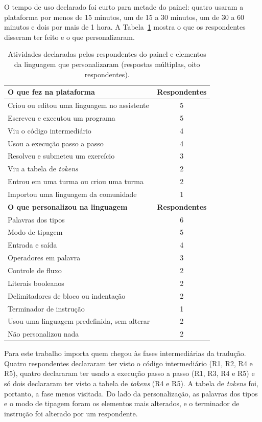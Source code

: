 O tempo de uso declarado foi curto para metade do painel: quatro usaram a plataforma por menos de 15 minutos, um de 15 a 30 minutos, um de 30 a 60 minutos e dois por mais de 1 hora. A Tabela~\ref{tab:resultado-atividades} mostra o que os respondentes disseram ter feito e o que personalizaram.

\begin{table}[htbp]
\centering
\caption{Atividades declaradas pelos respondentes do painel e elementos da linguagem que personalizaram (respostas múltiplas, oito respondentes).}
\label{tab:resultado-atividades}
\footnotesize
\renewcommand{\arraystretch}{1.2}
\begin{tabular}{|p{10.5cm}|c|}
\hline
\textbf{O que fez na plataforma} & \textbf{Respondentes} \\\hline
Criou ou editou uma linguagem no assistente & 5 \\\hline
Escreveu e executou um programa & 5 \\\hline
Viu o código intermediário & 4 \\\hline
Usou a execução passo a passo & 4 \\\hline
Resolveu e submeteu um exercício & 3 \\\hline
Viu a tabela de \textit{tokens} & 2 \\\hline
Entrou em uma turma ou criou uma turma & 2 \\\hline
Importou uma linguagem da comunidade & 1 \\\hline
\textbf{O que personalizou na linguagem} & \textbf{Respondentes} \\\hline
Palavras dos tipos & 6 \\\hline
Modo de tipagem & 5 \\\hline
Entrada e saída & 4 \\\hline
Operadores em palavra & 3 \\\hline
Controle de fluxo & 2 \\\hline
Literais booleanos & 2 \\\hline
Delimitadores de bloco ou indentação & 2 \\\hline
Terminador de instrução & 1 \\\hline
Usou uma linguagem predefinida, sem alterar & 2 \\\hline
Não personalizou nada & 2 \\\hline
\end{tabular}
\end{table}

Para este trabalho importa quem chegou às fases intermediárias da tradução. Quatro respondentes declararam ter visto o código intermediário (R1, R2, R4 e R5), quatro declararam ter usado a execução passo a passo (R1, R3, R4 e R5) e só dois declararam ter visto a tabela de \textit{tokens} (R4 e R5). A tabela de \textit{tokens} foi, portanto, a fase menos visitada. Do lado da personalização, as palavras dos tipos e o modo de tipagem foram os elementos mais alterados, e o terminador de instrução foi alterado por um respondente.

